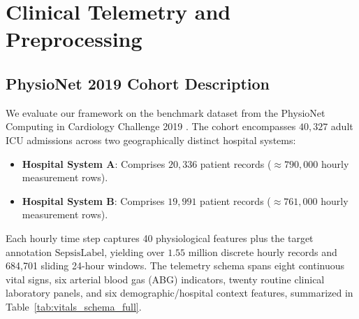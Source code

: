 \documentclass[journal,twocolumn,10pt]{IEEEtran}
\begin{document}
\section{Clinical Telemetry and Preprocessing}
\subsection{PhysioNet 2019 Cohort Description}
We evaluate our framework on the benchmark dataset from the PhysioNet Computing in Cardiology Challenge 2019 \cite{reyna2020physionet}. The cohort encompasses $40,327$ adult ICU admissions across two geographically distinct hospital systems:
\begin{itemize}
    \item \textbf{Hospital System A}: Comprises $20,336$ patient records ($\approx 790,000$ hourly measurement rows).
    \item \textbf{Hospital System B}: Comprises $19,991$ patient records ($\approx 761,000$ hourly measurement rows).
\end{itemize}
Each hourly time step captures 40 physiological features plus the target annotation $\text{SepsisLabel}$, yielding over $1.55$ million discrete hourly records and 684,701 sliding 24-hour windows. The telemetry schema spans eight continuous vital signs, six arterial blood gas (ABG) indicators, twenty routine clinical laboratory panels, and six demographic/hospital context features, summarized in Table~\ref{tab:vitals_schema_full}.
\end{document}
